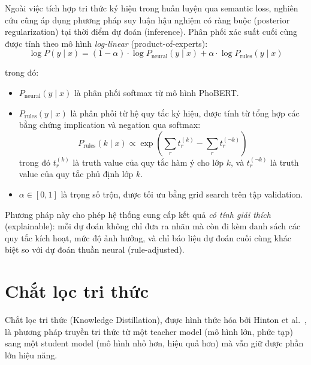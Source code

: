 Ngoài việc tích hợp tri thức ký hiệu trong huấn luyện qua semantic loss, nghiên cứu cũng áp dụng phương pháp suy luận hậu nghiệm có ràng buộc (posterior regularization) tại thời điểm dự đoán (inference). Phân phối xác suất cuối cùng được tính theo mô hình \textit{log-linear} (product-of-experts):
\begin{equation}
    \log P(y \mid x) = (1 - \alpha) \cdot \log P_{\text{neural}}(y \mid x) + \alpha \cdot \log P_{\text{rules}}(y \mid x)
    \label{eq:constrained_inference}
\end{equation}

\noindent trong đó:
\begin{itemize}
    \item $P_{\text{neural}}(y \mid x)$ là phân phối softmax từ mô hình PhoBERT.
    \item $P_{\text{rules}}(y \mid x)$ là phân phối từ hệ quy tắc ký hiệu, được tính từ tổng hợp các bằng chứng implication và negation qua softmax:
    \begin{equation}
        P_{\text{rules}}(k \mid x) \propto \exp\left(\sum_r t_r^{(k)} - \sum_r t_r^{(\neg k)}\right)
    \end{equation}
    trong đó $t_r^{(k)}$ là truth value của quy tắc hàm ý cho lớp $k$, và $t_r^{(\neg k)}$ là truth value của quy tắc phủ định lớp $k$.
    \item $\alpha \in [0,1]$ là trọng số trộn, được tối ưu bằng grid search trên tập validation.
\end{itemize}

Phương pháp này cho phép hệ thống cung cấp kết quả \textit{có tính giải thích} (explainable): mỗi dự đoán không chỉ đưa ra nhãn mà còn đi kèm danh sách các quy tắc kích hoạt, mức độ ảnh hưởng, và chỉ báo liệu dự đoán cuối cùng khác biệt so với dự đoán thuần neural (rule-adjusted).


\section{Chắt lọc tri thức}
\label{sec:knowledge_distillation}

Chắt lọc tri thức (Knowledge Distillation), được hình thức hóa bởi Hinton et al.~\cite{hinton2015distilling}, là phương pháp truyền tri thức từ một teacher model (mô hình lớn, phức tạp) sang một student model (mô hình nhỏ hơn, hiệu quả hơn) mà vẫn giữ được phần lớn hiệu năng.

